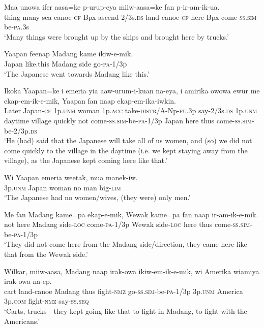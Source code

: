 \ea
\gll  Maa  unowa  ifer  aasa=ke  p-urup-eya  miiw-aasa=ke fan  p-ir-am-ik-ua.\\
thing  many  sea  canoe-\textsc{cf}  Bpx-ascend-2/3s.\textsc{ds}  land-canoe-\textsc{cf} here  Bpx-come-\textsc{ss}.\textsc{sim}-be-\textsc{pa}.3s\\ 
\glt ‘Many things were brought up by the ships and brought here by trucks.’ \\
\z


\ea
\gll  Yaapan  feenap  Madang  kame  ikiw-e-mik. \\
Japan  like.this  Madang  side  go-\textsc{pa}-1/3p \\
\glt ‘The Japanese went towards Madang like this.’ \\
\z


\ea
\gll  Ikoka  Yaapan=ke  i  emeria  yia  aaw-urum-i-kuan na-eya,  i  amirika  owowa  ewur  me ekap-em-ik-e-mik,  Yaapan  fan  naap  ekap-em-ika-iwkin. \\
Later  Japan-\textsc{cf}  1p.\textsc{unm}  woman  1p.\textsc{acc}  take-\textsc{distr}/A-Np-\textsc{fu}.3p say-2/3s.\textsc{ds}  1p.\textsc{unm}  daytime  village  quickly  not come-\textsc{ss}.\textsc{sim}-be-\textsc{pa}-1/3p  Japan  here  thus  come-\textsc{ss}.\textsc{sim}-be-2/3p.\textsc{ds} \\
\glt ‘He (had) said that the Japanese will take all of us women, and (so) we did not come quickly to the village in the daytime (i.e. we kept staying away from the village), as the Japanese kept coming here like that.’ \\
\z


\ea
\gll  Wi  Yaapan  emeria  weetak,  mua  manek-iw. \\
3p.\textsc{unm}  Japan  woman  no  man  big-\textsc{lim} \\
\glt ‘The Japanese had no women/wives, (they were) only men.’ \\
\z


\ea
\gll  Me  fan  Madang  kame=pa  ekap-e-mik, Wewak  kame=pa  fan  naap  ir-am-ik-e-mik. \\
not  here  Madang  side-\textsc{loc}  come-\textsc{pa}-1/3p Wewak  side-\textsc{loc}  here  thus  come-\textsc{ss}.\textsc{sim}-be-\textsc{pa}-1/3p\\ 
\glt ‘They did not come here from the Madang side/direction, they came here like that from the Wewak side.’ \\
\z


\ea
\gll  Wilkar,  miiw-aasa,  Madang  naap  irak-owa  ikiw-em-ik-e-mik, wi  Amerika  wiamiya  irak-owa  na-ep. \\
cart  land-canoe  Madang  thus  fight-\textsc{nmz}  go-\textsc{ss}.\textsc{sim}-be-\textsc{pa}-1/3p 3p.\textsc{unm}  America  3p.\textsc{com}  fight-\textsc{nmz}  say{}-\textsc{ss.seq}\\ 
\glt ‘Carts, trucks - they kept going like that to fight in Madang, to fight with the Americans.’ \\
\z


